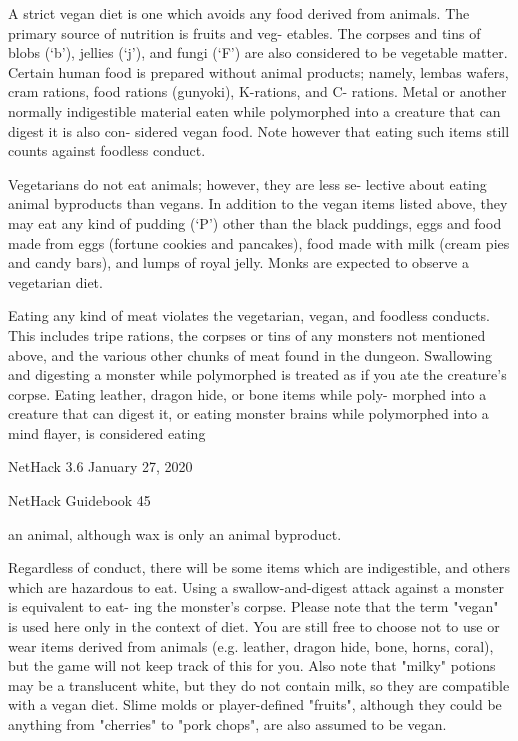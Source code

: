 \documentclass[11pt]{article}
\begin{document}
   A strict vegan diet is one which avoids any food derived
from animals. The primary source of nutrition is fruits and veg-
etables. The corpses and tins of blobs (`b'), jellies (`j'), and
fungi (`F') are also considered to be vegetable matter.  Certain
human food is prepared without animal products; namely, lembas
wafers, cram rations, food rations (gunyoki), K-rations, and C-
rations.  Metal or another normally indigestible material eaten
while polymorphed into a creature that can digest it is also con-
sidered vegan food.  Note however that eating such items still
counts against foodless conduct.

   Vegetarians do not eat animals; however, they are less se-
lective about eating animal byproducts than vegans. In addition
to the vegan items listed above, they may eat any kind of pudding
(`P') other than the black puddings, eggs and food made from eggs
(fortune cookies and pancakes), food made with milk (cream pies
and candy bars), and lumps of royal jelly. Monks are expected to
observe a vegetarian diet.

   Eating any kind of meat violates the vegetarian, vegan, and
foodless conducts.  This includes tripe rations, the corpses or
tins of any monsters not mentioned above, and the various other
chunks of meat found in the dungeon. Swallowing and digesting a
monster while polymorphed is treated as if you ate the creature's
corpse.  Eating leather, dragon hide, or bone items while poly-
morphed into a creature that can digest it, or eating monster
brains while polymorphed into a mind flayer, is considered eating


NetHack 3.6                   January 27, 2020





NetHack Guidebook                       45



an animal, although wax is only an animal byproduct.

   Regardless of conduct, there will be some items which are
indigestible, and others which are hazardous to eat. Using a
swallow-and-digest attack against a monster is equivalent to eat-
ing the monster's corpse. Please note that the term "vegan" is
used here only in the context of diet. You are still free to
choose not to use or wear items derived from animals (e.g.
leather, dragon hide, bone, horns, coral), but the game will not
keep track of this for you. Also note that "milky" potions may
be a translucent white, but they do not contain milk, so they are
compatible with a vegan diet.  Slime molds or player-defined
"fruits", although they could be anything from "cherries" to
"pork chops", are also assumed to be vegan.
\end{document}
